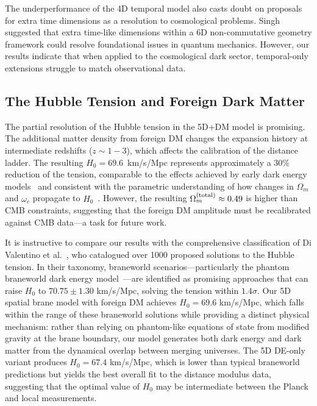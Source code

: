 \documentclass[12pt]{article}
\begin{document}
The underperformance of the 4D temporal model also casts doubt on proposals for extra time dimensions as a resolution to cosmological problems. Singh~\cite{singh2025} suggested that extra time-like dimensions within a 6D non-commutative geometry framework could resolve foundational issues in quantum mechanics. However, our results indicate that when applied to the cosmological dark sector, temporal-only extensions struggle to match observational data.

\subsection{The Hubble Tension and Foreign Dark Matter}

The partial resolution of the Hubble tension in the 5D+DM model is promising. The additional matter density from foreign DM changes the expansion history at intermediate redshifts ($z \sim 1-3$), which affects the calibration of the distance ladder. The resulting $H_0 = 69.6$~km/s/Mpc represents approximately a $30\%$ reduction of the tension, comparable to the effects achieved by early dark energy models~\cite{poulin2019} and consistent with the parametric understanding of how changes in $\Omega_m$ and $\omega_c$ propagate to $H_0$~\cite{pedrotti2024}. However, the resulting $\Omega_m^{\rm (total)} \approx 0.49$ is higher than CMB constraints, suggesting that the foreign DM amplitude must be recalibrated against CMB data---a task for future work.

It is instructive to compare our results with the comprehensive classification of Di Valentino et al.~\cite{divalentino2021}, who catalogued over 1000 proposed solutions to the Hubble tension. In their taxonomy, braneworld scenarios---particularly the phantom braneworld dark energy model~\cite{divalentino2021}---are identified as promising approaches that can raise $H_0$ to $70.75 \pm 1.30$ km/s/Mpc, solving the tension within $1.4\sigma$. Our 5D spatial brane model with foreign DM achieves $H_0 = 69.6$ km/s/Mpc, which falls within the range of these braneworld solutions while providing a distinct physical mechanism: rather than relying on phantom-like equations of state from modified gravity at the brane boundary, our model generates both dark energy and dark matter from the dynamical overlap between merging universes. The 5D DE-only variant produces $H_0 = 67.4$ km/s/Mpc, which is lower than typical braneworld predictions but yields the best overall fit to the distance modulus data, suggesting that the optimal value of $H_0$ may be intermediate between the Planck and local measurements.
\end{document}

